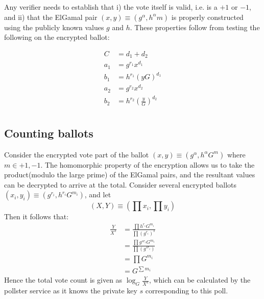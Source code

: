 Any verifier needs to establish that i)
the vote itself is valid, i.e. is a $+1$ or $-1$, and ii) that the ElGamal
pair $(x,y) \equiv (g^\alpha, h^\alpha m)$ is properly constructed using the
publicly known values $g$ and $h$.  These properties follow from testing
the following on the encrypted ballot:

\begin{equation} \label{eq4}
\begin{split}
C & = d_1 + d_2  \\
a_1 & = g^{r_1} x^{d_1}  \\
b_1 & = h^{r_1} (yG)^{d_1} \\
a_2 & = g^{r_2} x^{d_2} \\
b_2 & = h^{r_2}(\frac{y}{G})^{d_2} \\
\end{split}
\end{equation}


\subsection{Counting ballots}

Consider the encrypted vote part of the ballot $(x,y) \equiv (g^\alpha, h^\alpha G^m)$
where $m \in {+1, -1}$.
The homomorphic property of the encryption allows us to take the product(modulo
the large prime) of the ElGamal pairs, and the resultant values can be decrypted to
arrive at the total.   Consider several encrypted ballots
$(x_i,y_i) \equiv (g^{r_i} , h^{r_i} G^{m_i})$, and let 
\[
(X,Y) \equiv (\prod x_i , \prod y_i) 
\]
Then it follows that:
\begin{equation} \label{eq5}
\begin{split}
  \frac{Y}{X^s} & = \frac{\prod h^{r_i} G^{m_i}}{ \prod (g^{r_i})^s } \\
  & =  \frac{\prod g^{sr_i} G^{m_i}}{ \prod (g^{sr_i}) } \\
  & = \prod G^{m_i} \\
   & = G^{\sum m_i}
\end{split}
\end{equation}
Hence the total vote count is given as $\log_G \frac{Y}{X^s}$, which can be
calculated by the pollster service as it knows the private key $s$ corresponding
to this poll.

